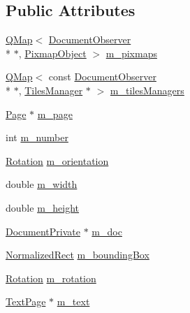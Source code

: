 \subsection*{Public Attributes}
\begin{DoxyCompactItemize}
\item 
\hyperlink{classQMap}{Q\+Map}$<$ \hyperlink{classOkular_1_1DocumentObserver}{Document\+Observer} \\*
$\ast$, \hyperlink{classOkular_1_1PagePrivate_1_1PixmapObject}{Pixmap\+Object} $>$ \hyperlink{classOkular_1_1PagePrivate_aa24cb69b4eb47c8798c1b06a88f93b6c}{m\+\_\+pixmaps}
\item 
\hyperlink{classQMap}{Q\+Map}$<$ const \hyperlink{classOkular_1_1DocumentObserver}{Document\+Observer} \\*
$\ast$, \hyperlink{classOkular_1_1TilesManager}{Tiles\+Manager} $\ast$ $>$ \hyperlink{classOkular_1_1PagePrivate_a4735784ca4e23f35a55250e827f62d67}{m\+\_\+tiles\+Managers}
\item 
\hyperlink{classOkular_1_1Page}{Page} $\ast$ \hyperlink{classOkular_1_1PagePrivate_a07c3e158a239c990c2ddcac53a6dd3c6}{m\+\_\+page}
\item 
int \hyperlink{classOkular_1_1PagePrivate_a449baffebfd4db332b181cb2e644ab5e}{m\+\_\+number}
\item 
\hyperlink{namespaceOkular_a8556d00465f61ef533c6b027669e7da6}{Rotation} \hyperlink{classOkular_1_1PagePrivate_a942827926c5eaa9ca5a022aa48187e1d}{m\+\_\+orientation}
\item 
double \hyperlink{classOkular_1_1PagePrivate_a3350b64842d008c59422f1b4fe6d7243}{m\+\_\+width}
\item 
double \hyperlink{classOkular_1_1PagePrivate_a767bcd56f261640f129e9ab39b9b0ff6}{m\+\_\+height}
\item 
\hyperlink{classOkular_1_1DocumentPrivate}{Document\+Private} $\ast$ \hyperlink{classOkular_1_1PagePrivate_ab08c9b47d5e631b19dd2d5c85360d351}{m\+\_\+doc}
\item 
\hyperlink{classOkular_1_1NormalizedRect}{Normalized\+Rect} \hyperlink{classOkular_1_1PagePrivate_adf03548582e08ea9cac9944a0962bcf6}{m\+\_\+bounding\+Box}
\item 
\hyperlink{namespaceOkular_a8556d00465f61ef533c6b027669e7da6}{Rotation} \hyperlink{classOkular_1_1PagePrivate_a1560700ffacd812bbe962a21dc11be26}{m\+\_\+rotation}
\item 
\hyperlink{classOkular_1_1TextPage}{Text\+Page} $\ast$ \hyperlink{classOkular_1_1PagePrivate_a4cec09776018bc9ba579c2621dc0dbb6}{m\+\_\+text}
\item 

\end{DoxyCompactItemize}
